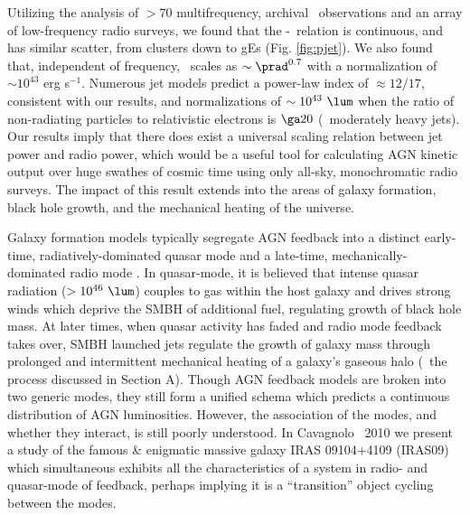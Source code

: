 \documentclass[letterpaper,12pt]{article}
\begin{document}
Utilizing the analysis of $> 70$ multifrequency, archival
\vla\ observations and an array of low-frequency radio surveys, we
found that the \pjet-\prad\ relation is continuous, and has similar
scatter, from clusters down to gEs (Fig. \ref{fig:pjet}). We also
found that, independent of frequency, \pjet\ scales as $\sim
\prad^{0.7}$ with a normalization of $\sim 10^{43}$ erg
s$^{-1}$. Numerous jet models predict a power-law index of $\approx
12/17$, consistent with our results, and normalizations of $\sim
10^{43} ~\lum$ when the ratio of non-radiating particles to
relativistic electrons is $\ga 20$ (\ie\ moderately heavy jets). Our
results imply that there does exist a universal scaling relation
between jet power and radio power, which would be a useful tool for
calculating AGN kinetic output over huge swathes of cosmic time using
only all-sky, monochromatic radio surveys. The impact of this result
extends into the areas of galaxy formation, black hole growth, and the
mechanical heating of the universe.

 Galaxy formation
models typically segregate AGN feedback into a distinct early-time,
radiatively-dominated quasar mode \citep[\eg][]{2005Natur.435..629S}
and a late-time, mechanically-dominated radio mode
\citep[\eg][]{croton06}. In quasar-mode, it is believed that intense
quasar radiation ($> 10^{46} ~\lum$) couples to gas within the host
galaxy and drives strong winds which deprive the SMBH of additional
fuel, regulating growth of black hole mass. At later times, when
quasar activity has faded and radio mode feedback takes over, SMBH
launched jets regulate the growth of galaxy mass through prolonged and
intermittent mechanical heating of a galaxy's gaseous halo (\ie\ the
process discussed in Section A). Though AGN feedback models are broken
into two generic modes, they still form a unified schema
\citep[\eg][]{sijacki07} which predicts a continuous distribution of
AGN luminosities. However, the association of the modes, and whether
they interact, is still poorly understood. In Cavagnolo \etal\ 2010
\citep{iras09} we present a study of the famous \& enigmatic massive
galaxy IRAS 09104+4109 (IRAS09) which simultaneous exhibits all the
characteristics of a system in radio- and quasar-mode of feedback,
perhaps implying it is a ``transition'' object cycling between the
modes.
\end{document}
